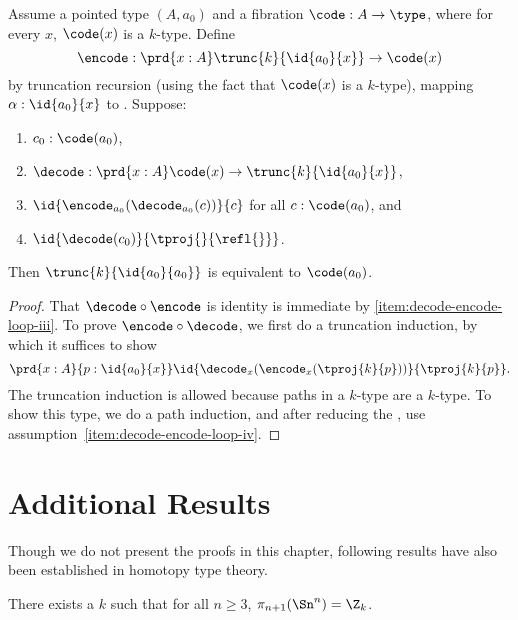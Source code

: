 {\begin{lem}
Assume a pointed type $(A,a_0)$ and a fibration
$\code : A \to \type$, where for every $x$, $\code(x)$ is a $k$-type.
Define
\[
\encode : \prd{x:A} \trunc{k}{\id{a_0}{x}} \to \code(x)
\]
by truncation recursion (using the fact
that $\code(x)$ is a $k$-type), mapping $\alpha : \id{a_0}{x}$ to
. Suppose:
\begin{enumerate}
\item $c_0 : \code(a_0)$,
\item $\decode : \prd{x:A} \code(x) \to \trunc{k}{\id{a_0}{x}}$,
\item \label{item:decode-encode-loop-iii}
  $\id{\encode_{a_0}(\decode_{a_0}(c))}{c}$ for all $c : \code(a_0)$, and
\item \label{item:decode-encode-loop-iv}
  $\id{\decode(c_0)}{\tproj{}{\refl{}}}$.
\end{enumerate}
Then $\trunc{k}{\id{a_0}{a_0}}$ is equivalent to $\code(a_0)$.
\end{lem}

\begin{proof}
That $\decode \circ \encode$ is identity is immediate by \ref{item:decode-encode-loop-iii}.
%
To prove $\encode \circ \decode$, we first do a truncation induction, by
which it suffices to show
\[
\prd{x:A}{p : \id{a_0}{x}} \id{\decode_{x}(\encode_{x}(\tproj{k}{p}))}{\tproj{k}{p}}.
\]
The truncation induction is allowed because paths in a $k$-type are a
$k$-type.  To show this type, we do a path induction, and after reducing
the \encode, use assumption~\ref{item:decode-encode-loop-iv}.
\end{proof}

\section{Additional Results}
\label{sec:moreresults}

Though we do not present the proofs in this chapter, following results have also been established in homotopy type theory.

\begin{thm}
There exists a $k$ such that for all $n \ge 3$, $\pi_{n+1}(\Sn ^n) =
\Z_k$.
\end{thm}

}

